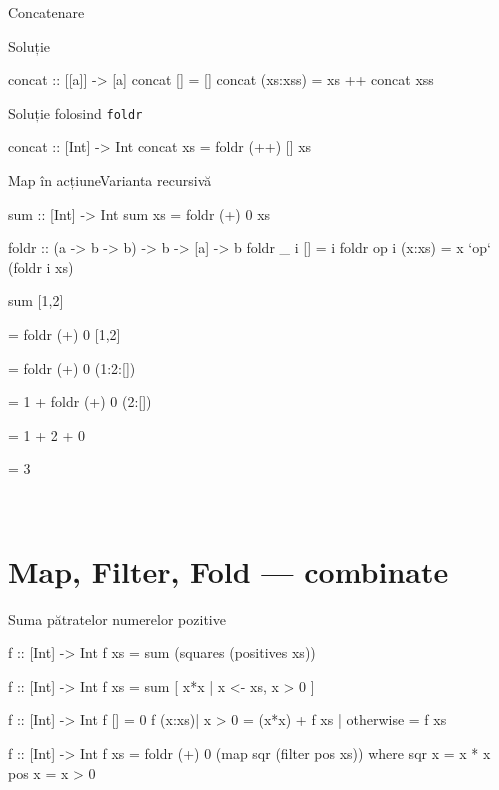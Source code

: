 \documentclass[xcolor=pdftex,romanian,colorlinks]{beamer}
\begin{document}
\begin{frame}[fragile]{Concatenare}
\begin{block}{Soluție }
\begin{asciihs}
concat :: [[a]] -> [a]
concat []       = []
concat (xs:xss) = xs ++ concat xss
\end{asciihs}
\end{block}
\begin{block}{Soluție folosind \lstinline$foldr$}
\begin{asciihs}
concat :: [Int] -> Int
concat xs = foldr (++) [] xs
\end{asciihs}
\end{block}
\end{frame}


\begin{frame}[fragile]{Map în acțiune}{Varianta recursivă}
\begin{asciihs}
sum :: [Int] -> Int
sum xs = foldr (+) 0 xs

foldr :: (a -> b -> b) -> b -> [a] -> b
foldr _ i []      = i
foldr op i (x:xs) = x `op` (foldr i xs)
\end{asciihs}

\vfill
sum [1,2]

\medskip
= foldr (+) 0 [1,2]

\medskip
= foldr (+) 0 (1:2:[])

\medskip
{}
= 1 + foldr (+) 0 (2:[])

\medskip
{}
= 1 + 2 + 0

\medskip
= 3

\medskip

\vfill\
\end{frame}

\section{Map, Filter, Fold --- combinate}

\begin{frame}[fragile]{Suma pătratelor numerelor pozitive}
\begin{asciihs}
f :: [Int] -> Int
f xs = sum (squares (positives xs))

f :: [Int] -> Int
f xs = sum [ x*x | x <- xs, x > 0 ]

f :: [Int] -> Int
f []                = 0
f (x:xs)| x > 0     = (x*x) + f xs
        | otherwise = f xs
        
f :: [Int] -> Int
f xs = foldr (+) 0 (map sqr (filter pos xs))
  where
    sqr x = x * x
    pos x = x > 0
\end{asciihs}
\end{frame}
\end{document}
